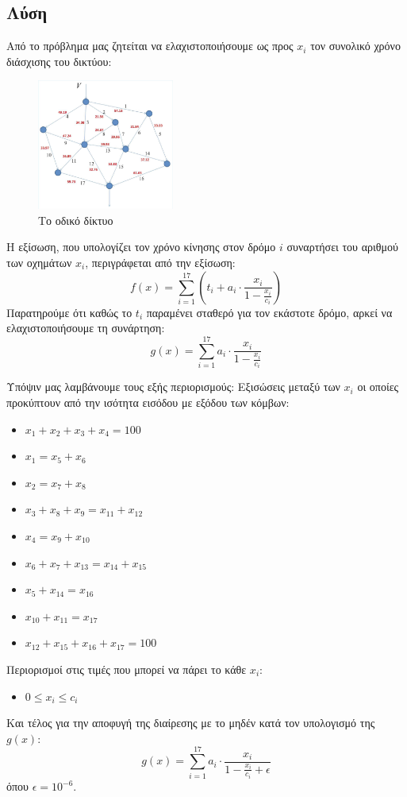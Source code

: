 \documentclass[twocolumn]{report}
\begin{document}
\subsection*{Λύση}
Από το πρόβλημα μας ζητείται να ελαχιστοποιήσουμε ως προς $x_i$ τον συνολικό
χρόνο διάσχισης του δικτύου:
\begin{figure}[H]
    \centering
    \includegraphics[width=0.4\textwidth]{media/network.png}
    \caption{Το οδικό δίκτυο}
\end{figure}

Η εξίσωση, που υπολογίζει τον χρόνο κίνησης στον δρόμο $i$ συναρτήσει του αριθμού 
των οχημάτων $x_i$, περιγράφεται από την εξίσωση:
$$f(x) = \sum_{i=1}^{17} \left( t_i + a_i \cdot \frac{x_i}{1 - \frac{x_i}{c_i}} \right)$$
Παρατηρούμε ότι καθώς το $t_i$ παραμένει σταθερό για τον εκάστοτε δρόμο, αρκεί 
να ελαχιστοποιήσουμε τη συνάρτηση:
$$g(x) = \sum_{i=1}^{17} a_i \cdot \frac{x_i}{1 - \frac{x_i}{c_i}}$$

Υπόψιν μας λαμβάνουμε τους εξής περιορισμούς:
\smallskip 
Εξισώσεις μεταξύ των $x_i$ οι οποίες προκύπτουν από την ισότητα εισόδου με εξόδου
των κόμβων:
\begin{itemize}
    \item $x_1 + x_2 + x_3 + x_4 = 100$
    \item $x_1 = x_5 + x_6$
    \item $x_2 = x_7 + x_8$
    \item $x_3 + x_8 + x_9 = x_{11} + x_{12}$
    \item $x_4 = x_9 + x_{10}$
    \item $x_6 + x_7 + x_{13} = x_{14} + x_{15}$
    \item $x_5 + x_{14} = x_{16}$
    \item $x_{10} + x_{11} = x_{17}$
    \item $x_{12} + x_{15} + x_{16} + x_{17} = 100$
\end{itemize}
Περιορισμοί στις τιμές που μπορεί να πάρει το κάθε $x_i$:
\begin{itemize}
    \item $0 \leq x_i \leq c_i$
\end{itemize}
Και τέλος για την αποφυγή της διαίρεσης με το μηδέν κατά τον υπολογισμό της $g(x)$:
$$g(x) = \sum_{i=1}^{17} a_i \cdot \frac{x_i}{1 - \frac{x_i}{c_i}+ \epsilon}$$
όπου $\epsilon = 10^{-6}$.
\end{document}
